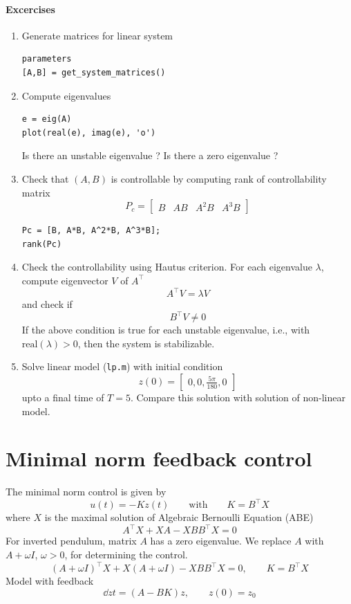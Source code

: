 \documentclass[12pt]{article}
\begin{document}
\paragraph{Excercises}

\begin{enumerate}

\item Generate matrices for linear system
\begin{lstlisting}
parameters
[A,B] = get_system_matrices()
\end{lstlisting}

\item Compute eigenvalues
\begin{lstlisting}
e = eig(A)
plot(real(e), imag(e), 'o')
\end{lstlisting}
Is there an unstable eigenvalue ? Is there a zero eigenvalue ?

\item Check that $(A,B)$ is controllable by computing rank of controllability matrix
\[
P_c = \begin{bmatrix} 
B & A B & A^2 B & A^3 B
\end{bmatrix}
\]
\begin{lstlisting}
Pc = [B, A*B, A^2*B, A^3*B];
rank(Pc)
\end{lstlisting}

\item Check the controllability using Hautus criterion. For each eigenvalue $\lambda$, compute eigenvector $V$ of $A^\top$
\[
A^\top V = \lambda V
\]
and check if 
\[
B^\top V \ne 0
\]
If the above condition is true for each unstable eigenvalue, i.e., with $\mbox{real}(\lambda) > 0$, then the system is stabilizable.

\item Solve linear model ({\tt lp.m}) with initial condition 
\[
z(0) = \begin{bmatrix} 0, 0, \frac{5\pi}{180}, 0 \end{bmatrix}
\]
upto a final time of $T=5$. Compare this solution with solution of non-linear model.

\end{enumerate}
\section{Minimal norm feedback control}
The minimal norm control is given by
\[
u(t) = - K z (t) \qquad\mbox{with}\qquad K = B^\top X
\]
where $X$ is the maximal solution of Algebraic Bernoulli Equation (ABE)
\[
A^\top X + X A - X B B^\top X = 0
\]
For inverted pendulum, matrix $A$ has a zero eigenvalue. We replace $A$ with $A+\omega I$, $\omega > 0$, for determining the control.
\[
(A+\omega I)^\top X + X (A+\omega I) - X B B^\top X = 0, \qquad K = B^\top X
\]
Model with feedback
\[
\dd{z}{t} = (A - BK)z, \qquad z(0) = z_0
\]
\end{document}
